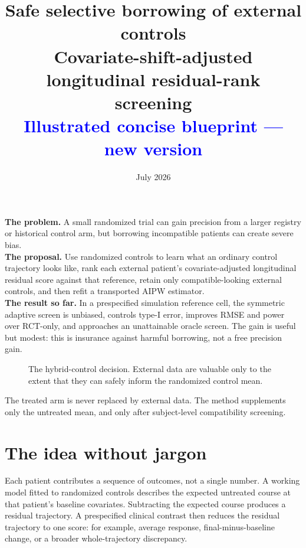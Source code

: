 \documentclass[10pt]{article}
\title{\vspace{-3em}\textbf{Safe selective borrowing of external controls}\\[0.35em]
\large Covariate-shift-adjusted longitudinal residual-rank screening\\[0.6em]
\normalsize\textcolor{blue}{Illustrated concise blueprint --- new version}}
\author{}
\date{July 2026}
\newcommand{\fullfig}[1]{\resizebox{\linewidth}{!}{}}
\begin{document}
\maketitle
\vspace{-2.2em}

\begin{center}
\begin{minipage}{0.94\linewidth}
\small
\textbf{The problem.} A small randomized trial can gain precision from a larger registry or historical control arm, but borrowing incompatible patients can create severe bias.\\[2pt]
\textbf{The proposal.} Use randomized controls to learn what an ordinary control trajectory looks like, rank each external patient's covariate-adjusted longitudinal residual score against that reference, retain only compatible-looking external controls, and then refit a transported AIPW estimator.\\[2pt]
\textbf{The result so far.} In a prespecified simulation reference cell, the symmetric adaptive screen is unbiased, controls type-I error, improves RMSE and power over RCT-only, and approaches an unattainable oracle screen. The gain is useful but modest: this is insurance against harmful borrowing, not a free precision gain.
\end{minipage}
\end{center}

\begin{figure}[!h]
\centering\fullfig{problem_landscape.tex}
\caption{The hybrid-control decision. External data are valuable only to the extent that they can safely inform the randomized control mean.}
\end{figure}

\begin{takeaway}
The treated arm is never replaced by external data. The method supplements only the untreated mean, and only after subject-level compatibility screening.
\end{takeaway}

\clearpage
\section{The idea without jargon}

Each patient contributes a sequence of outcomes, not a single number. A working model fitted to randomized controls describes the expected untreated course at that patient's baseline covariates. Subtracting the expected course produces a residual trajectory. A prespecified clinical contrast then reduces the residual trajectory to one score: for example, average response, final-minus-baseline change, or a broader whole-trajectory discrepancy.
\end{document}
